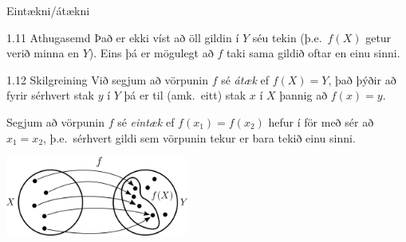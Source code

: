 \documentclass[icelandic,a4paper,12pt]{article}
\begin{document}
\begin{frame}{Eintækni/átækni}
\begin{block}{1.11 Athugasemd}
Það er ekki víst að öll gildin í $Y$ séu tekin (þ.e.~$f(X)$
getur verið minna en $Y$). Eins þá er mögulegt að $f$
taki sama gildið oftar en einu sinni.
\end{block}

\pause

\begin{block}{1.12 Skilgreining}
Við segjum að vörpunin $f$ sé \emph{átæk} ef $f(X)=Y$, það þýðir að 
fyrir sérhvert stak $y$ í $Y$ þá er til (amk.~eitt) stak
$x$ í $X$ þannig að $f(x)=y$.

\pause

Segjum að vörpunin $f$ sé \emph{eintæk} ef $f(x_1) = f(x_2)$ 
hefur í för með sér að $x_1=x_2$, þ.e.~sérhvert gildi sem
vörpunin tekur er bara tekið einu sinni.
\end{block}

\begin{center}
 \includegraphics[width=6cm,keepaspectratio=true]{./myndir/kafli01/02_Mynd_vorpunar.png}
\end{center}

\end{frame}
\end{document}
